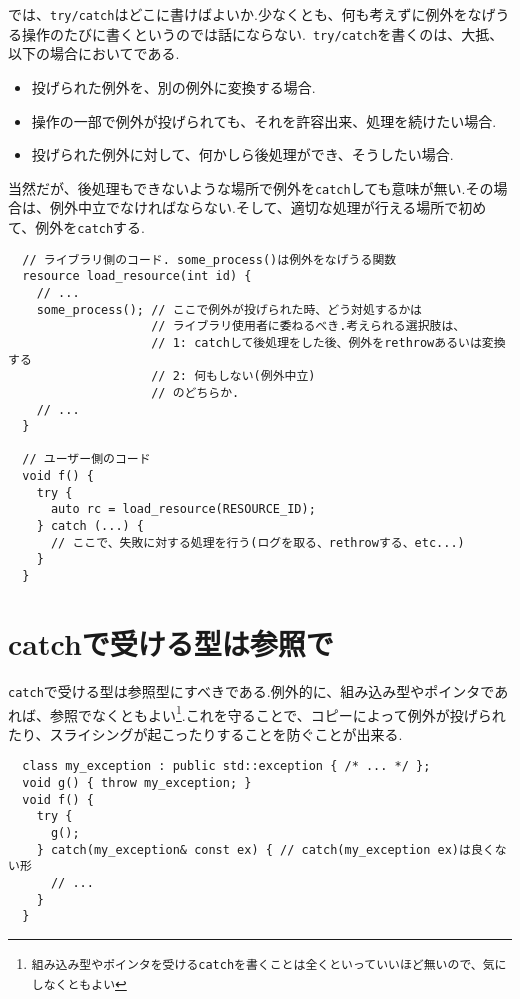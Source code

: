 \documentclass[a4j,11pt,openright]{jsbook}
\begin{document}
では、\verb|try/catch|はどこに書けばよいか.少なくとも、何も考えずに例外をなげうる操作のたびに書くというのでは話にならない.\ \verb|try/catch|を書くのは、大抵、以下の場合においてである.

\begin{itemize}
  \item 投げられた例外を、別の例外に変換する場合.
  \item 操作の一部で例外が投げられても、それを許容出来、処理を続けたい場合.
  \item 投げられた例外に対して、何かしら後処理ができ、そうしたい場合.
\end{itemize}

当然だが、後処理もできないような場所で例外を\verb|catch|しても意味が無い.その場合は、例外中立でなければならない.そして、適切な処理が行える場所で初めて、例外を\verb|catch|する.

\begin{verbatim}
  // ライブラリ側のコード. some_process()は例外をなげうる関数
  resource load_resource(int id) {
    // ...
    some_process(); // ここで例外が投げられた時、どう対処するかは
                    // ライブラリ使用者に委ねるべき.考えられる選択肢は、
                    // 1: catchして後処理をした後、例外をrethrowあるいは変換する
                    // 2: 何もしない(例外中立)
                    // のどちらか.
    // ...
  }

  // ユーザー側のコード
  void f() {
    try {
      auto rc = load_resource(RESOURCE_ID);
    } catch (...) {
      // ここで、失敗に対する処理を行う(ログを取る、rethrowする、etc...)
    }
  }
\end{verbatim}

\section{catchで受ける型は参照で}

\verb|catch|で受ける型は参照型にすべきである.例外的に、組み込み型やポインタであれば、参照でなくともよい\footnote{\texttt{組み込み型やポインタを受けるcatchを書くことは全くといっていいほど無いので、気にしなくともよい}}.これを守ることで、コピーによって例外が投げられたり、スライシングが起こったりすることを防ぐことが出来る.

\begin{verbatim}
  class my_exception : public std::exception { /* ... */ };
  void g() { throw my_exception; }
  void f() {
    try {
      g();
    } catch(my_exception& const ex) { // catch(my_exception ex)は良くない形
      // ...
    }
  }
\end{verbatim}
\end{document}
